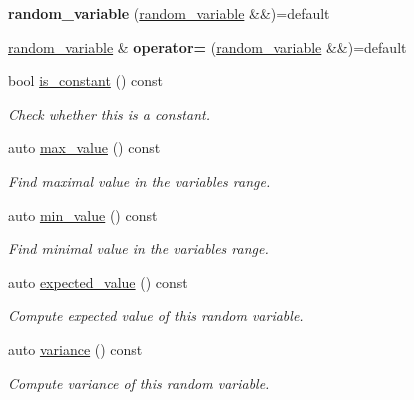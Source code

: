 \begin{DoxyCompactItemize}
\item 
\mbox{\label{classdice_1_1random__variable_adfe32efb1c2f20260374a28078ed9b1f}} 
{\bfseries random\+\_\+variable} (\mbox{\hyperlink{classdice_1_1random__variable}{random\+\_\+variable}} \&\&)=default
\item 
\mbox{\label{classdice_1_1random__variable_ad234b4fd5bb4422dcbd2e0b38ca95851}} 
\mbox{\hyperlink{classdice_1_1random__variable}{random\+\_\+variable}} \& {\bfseries operator=} (\mbox{\hyperlink{classdice_1_1random__variable}{random\+\_\+variable}} \&\&)=default
\item 
bool \mbox{\hyperlink{classdice_1_1random__variable_a42d682610d251d5305dd349a71a023eb}{is\+\_\+constant}} () const
\begin{DoxyCompactList}\small\item\em Check whether this is a constant. \end{DoxyCompactList}\item 
auto \mbox{\hyperlink{classdice_1_1random__variable_a1cf78d3c3fa4b13d85215b873a50be5f}{max\+\_\+value}} () const
\begin{DoxyCompactList}\small\item\em Find maximal value in the variable\textquotesingle{}s range. \end{DoxyCompactList}\item 
auto \mbox{\hyperlink{classdice_1_1random__variable_ab926693f2773202c8fce755d4664052f}{min\+\_\+value}} () const
\begin{DoxyCompactList}\small\item\em Find minimal value in the variable\textquotesingle{}s range. \end{DoxyCompactList}\item 
auto \mbox{\hyperlink{classdice_1_1random__variable_a210faa1d7ac3aa393804d87f828ca91c}{expected\+\_\+value}} () const
\begin{DoxyCompactList}\small\item\em Compute expected value of this random variable. \end{DoxyCompactList}\item 
auto \mbox{\hyperlink{classdice_1_1random__variable_ae709a9985d1e722629fc13c26f405e61}{variance}} () const
\begin{DoxyCompactList}\small\item\em Compute variance of this random variable. \end{DoxyCompactList}\item 

\end{DoxyCompactItemize}
